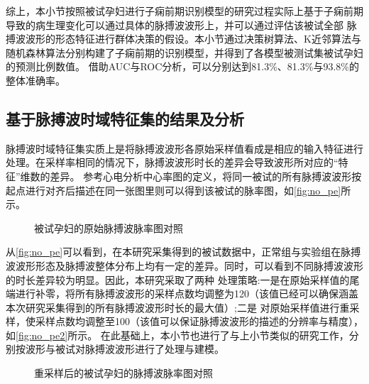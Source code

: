 综上，本小节按照被试孕妇进行子痫前期识别模型的研究过程实际上基于子痫前期导致的病生理变化可以通过具体的脉搏波波形上，并可以通过评估该被试全部
脉搏波波形的形态特征进行群体决策的假设。本小节通过决策树算法、K近邻算法与随机森林算法分别构建了子痫前期的识别模型，并得到了各模型被测试集被试孕妇的预测比例数值。
借助AUC与ROC分析，可以分别达到81.3\%、81.3\%与93.8\%的整体准确率。

\subsection{基于脉搏波时域特征集的结果及分析}

脉搏波时域特征集实质上是将脉搏波波形各原始采样值看成是相应的输入特征进行处理。在采样率相同的情况下，脉搏波波形时长的差异会导致波形所对应的“特征”维数的差异。
参考心电分析中心率图的定义，将同一被试的所有脉搏波波形按起点进行对齐后描述在同一张图里则可以得到该被试的脉率图，如\autoref{fig:no_pe}所示。
\begin{figure}[htbp]
      \centering
      \quad
      \quad
      \quad
      \caption{\label{fig:no_pe}被试孕妇的原始脉搏波脉率图对照}
\end{figure}

从\autoref{fig:no_pe}可以看到，在本研究采集得到的被试数据中，正常组与实验组在脉搏波波形形态及脉搏波整体分布上均有一定的差异。同时，可以看到不同脉搏波波形的时长差异较为明显。因此，本研究采取了两种
处理策略:一是在原始采样值的尾端进行补零，将所有脉搏波波形的采样点数均调整为120（该值已经可以确保涵盖本次研究采集得到的所有脉搏波波形时长的最大值）;二是
对原始采样值进行重采样，使采样点数均调整至100（该值可以保证脉搏波波形的描述的分辨率与精度），如\autoref{fig:no_pe2}所示。
在此基础上，本小节也进行了与上小节类似的研究工作，分别按波形与被试对脉搏波波形进行了处理与建模。

\begin{figure}[htbp]
      \centering
      \quad
      \quad
      \quad
      \caption{\label{fig:no_pe2}重采样后的被试孕妇的脉搏波脉率图对照}
\end{figure}

